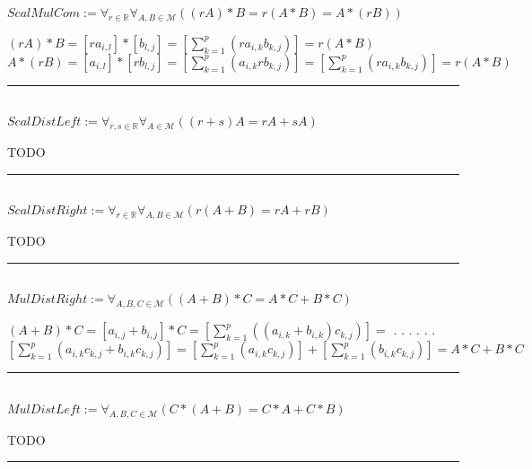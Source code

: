 \documentclass{book}
\newcommand{\abr}{:=}
\newcommand{\cont}{\phantom{.}. . .\phantom{.}}
\newcommand{\pr}[1]{\left(#1\right)}
\begin{document}
$ScalMulCom \abr \forall_{r \in \mathbb{R}} \forall_{A, B \in \mathcal{M}}\pr{(r A) * B = r (A * B) = A * (r B)}$
\begin{enumerate}
  \lit $(r A) * B = [r a_{i, l}] * [b_{l, j}] = \left[\sum_{k = 1}^{p}(r a_{i, k} b_{k, j})\right] = r (A * B)$
  \lit $A * (r B) = [a_{i, l}] * [r b_{l, j}] = \left[\sum_{k = 1}^{p}(a_{i, k} r b_{k, j})\right] = \left[\sum_{k = 1}^{p}(r a_{i, k} b_{k, j})\right] = r (A * B)$
\end{enumerate} \vspace{.75mm} \hrule \vspace{.75mm} \ \\ 

$ScalDistLeft \abr \forall_{r, s \in \mathbb{R}} \forall_{A \in \mathcal{M}}\pr{(r + s) A = r A + s A}$
\begin{enumerate}
  \lit TODO
\end{enumerate} \vspace{.75mm} \hrule \vspace{.75mm} \ \\ 

$ScalDistRight \abr \forall_{r \in \mathbb{R}} \forall_{A, B \in \mathcal{M}}\pr{r (A + B) = r A + r B}$
\begin{enumerate}
  \lit TODO
\end{enumerate} \vspace{.75mm} \hrule \vspace{.75mm} \ \\ 

$MulDistRight \abr \forall_{A, B, C \in \mathcal{M}}\pr{(A + B) * C = A * C + B * C}$
\begin{enumerate}
  \lit $(A + B) * C = [a_{i, j} + b_{i, j}] * C = \left[\sum_{k = 1}^{p}\pr{(a_{i, k} + b_{i, k}) c_{k, j}}\right] = $ \cont
  \lit \cont $\left[\sum_{k = 1}^{p}(a_{i, k} c_{k, j} + b_{i, k} c_{k, j})\right] = \left[\sum_{k = 1}^{p}(a_{i, k} c_{k, j})\right] + \left[\sum_{k = 1}^{p}(b_{i, k} c_{k, j})\right] = A * C + B * C$
\end{enumerate} \vspace{.75mm} \hrule \vspace{.75mm} \ \\ 

$MulDistLeft \abr \forall_{A, B, C \in \mathcal{M}}\pr{C * (A + B) = C * A + C * B}$
\begin{enumerate}
  \lit TODO
\end{enumerate} \vspace{.75mm} \hrule \vspace{.75mm} \ \\ 
\end{document}
